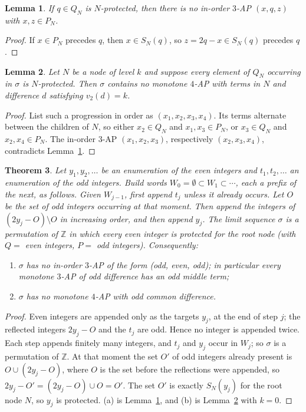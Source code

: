 \documentclass[11pt]{amsart}
\newtheorem{theorem}{Theorem}[section]
\newtheorem{lemma}[theorem]{Lemma}
\theoremstyle{definition}
\theoremstyle{remark}
\newcommand{\Z}{\mathbb{Z}}
\begin{document}
\begin{lemma}\label{lem:kill}
If $q\in Q_N$ is $N$-protected, then there is no in-order $3$-AP $(x,q,z)$ with $x,z\in P_N$.
\end{lemma}

\begin{proof}
If $x\in P_N$ precedes $q$, then $x\in S_N(q)$, so $z=2q-x\in S_N(q)$ precedes $q$.
\end{proof}

\begin{lemma}\label{lem:levelk}
Let $N$ be a node of level $k$ and suppose every element of $Q_N$ occurring in $\sigma$ is $N$-protected. Then $\sigma$ contains no monotone $4$-AP with terms in $N$ and difference $d$ satisfying $v_2(d)=k$.
\end{lemma}

\begin{proof}
List such a progression in order as $(x_1,x_2,x_3,x_4)$. Its terms alternate between the children of $N$, so either $x_2\in Q_N$ and $x_1,x_3\in P_N$, or $x_3\in Q_N$ and $x_2,x_4\in P_N$. The in-order $3$-AP $(x_1,x_2,x_3)$, respectively $(x_2,x_3,x_4)$, contradicts Lemma~\ref{lem:kill}.
\end{proof}

\begin{theorem}\label{thm:odd}
Let $y_1,y_2,\dots$ be an enumeration of the even integers and $t_1,t_2,\dots$ an enumeration of the odd integers. Build words $W_0=\emptyset\subset W_1\subset\cdots$, each a prefix of the next, as follows. Given $W_{j-1}$, first append $t_j$ unless it already occurs. Let $O$ be the set of odd integers occurring at that moment. Then append the integers of $(2y_j-O)\setminus O$ in increasing order, and then append $y_j$. The limit sequence $\sigma$ is a permutation of $\Z$ in which every even integer is protected for the root node (with $Q=$ even integers, $P=$ odd integers). Consequently:
\begin{enumerate}[label=\textup{(\alph*)}]
\item $\sigma$ has no in-order $3$-AP of the form (odd, even, odd); in particular every monotone $3$-AP of odd difference has an odd middle term;
\item $\sigma$ has no monotone $4$-AP with odd common difference.
\end{enumerate}
\end{theorem}

\begin{proof}
Even integers are appended only as the targets $y_j$, at the end of step $j$; the reflected integers $2y_j-O$ and the $t_j$ are odd. Hence no integer is appended twice. Each step appends finitely many integers, and $t_j$ and $y_j$ occur in $W_j$; so $\sigma$ is a permutation of $\Z$. At that moment the set $O'$ of odd integers already present is $O\cup(2y_j-O)$, where $O$ is the set before the reflections were appended, so $2y_j-O'=(2y_j-O)\cup O=O'$. The set $O'$ is exactly $S_N(y_j)$ for the root node $N$, so $y_j$ is protected. (a) is Lemma~\ref{lem:kill}, and (b) is Lemma~\ref{lem:levelk} with $k=0$.
\end{proof}
\end{document}
